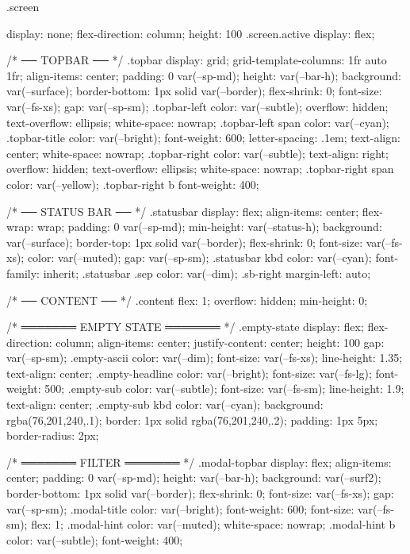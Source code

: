 .screen { display: none; flex-direction: column; height: 100%
.screen.active { display: flex; }

/* ── TOPBAR ── */
.topbar {
  display: grid;
  grid-template-columns: 1fr auto 1fr;
  align-items: center;
  padding: 0 var(--sp-md);
  height: var(--bar-h);
  background: var(--surface);
  border-bottom: 1px solid var(--border);
  flex-shrink: 0;
  font-size: var(--fs-xs);
  gap: var(--sp-sm);
}
.topbar-left  { color: var(--subtle); overflow: hidden; text-overflow: ellipsis; white-space: nowrap; }
.topbar-left span { color: var(--cyan); }
.topbar-title { color: var(--bright); font-weight: 600; letter-spacing: .1em; text-align: center; white-space: nowrap; }
.topbar-right { color: var(--subtle); text-align: right; overflow: hidden; text-overflow: ellipsis; white-space: nowrap; }
.topbar-right span { color: var(--yellow); }
.topbar-right b { font-weight: 400; }

/* ── STATUS BAR ── */
.statusbar {
  display: flex;
  align-items: center;
  flex-wrap: wrap;
  padding: 0 var(--sp-md);
  min-height: var(--status-h);
  background: var(--surface);
  border-top: 1px solid var(--border);
  flex-shrink: 0;
  font-size: var(--fs-xs);
  color: var(--muted);
  gap: var(--sp-sm);
}
.statusbar kbd { color: var(--cyan); font-family: inherit; }
.statusbar .sep { color: var(--dim); }
.sb-right { margin-left: auto; }

/* ── CONTENT ── */
.content { flex: 1; overflow: hidden; min-height: 0; }

/* ═══════ EMPTY STATE ═══════ */
.empty-state {
  display: flex;
  flex-direction: column;
  align-items: center;
  justify-content: center;
  height: 100%
  gap: var(--sp-sm);
}
.empty-ascii { color: var(--dim); font-size: var(--fs-xs); line-height: 1.35; text-align: center; }
.empty-headline { color: var(--bright); font-size: var(--fs-lg); font-weight: 500; }
.empty-sub { color: var(--subtle); font-size: var(--fs-sm); line-height: 1.9; text-align: center; }
.empty-sub kbd {
  color: var(--cyan);
  background: rgba(76,201,240,.1);
  border: 1px solid rgba(76,201,240,.2);
  padding: 1px 5px; border-radius: 2px;
}

/* ═══════ FILTER ═══════ */
.modal-topbar {
  display: flex; align-items: center;
  padding: 0 var(--sp-md); height: var(--bar-h);
  background: var(--surf2); border-bottom: 1px solid var(--border);
  flex-shrink: 0; font-size: var(--fs-xs); gap: var(--sp-sm);
}
.modal-title { color: var(--bright); font-weight: 600; font-size: var(--fs-sm); flex: 1; }
.modal-hint  { color: var(--muted); white-space: nowrap; }
.modal-hint b { color: var(--subtle); font-weight: 400; }

}
